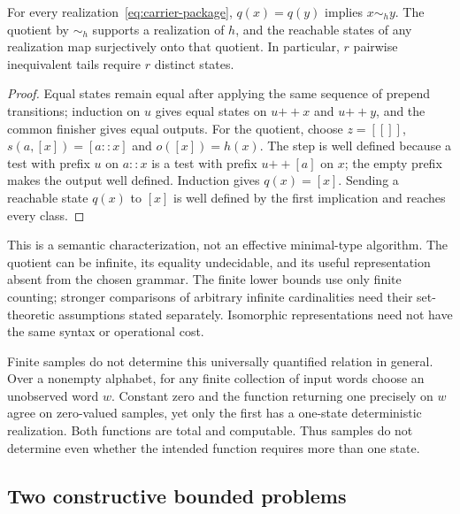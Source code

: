 \begin{theorem}
\label{thm:carrier-quotient}
For every realization~\eqref{eq:carrier-package}, $q(x)=q(y)$ implies
$x\sim_h y$. The quotient by $\sim_h$ supports a realization of $h$, and
the reachable states of any realization map surjectively onto that quotient.
In particular, $r$ pairwise inequivalent tails require $r$ distinct states.
\end{theorem}
\begin{proof}
Equal states remain equal after applying the same sequence of prepend
transitions; induction on $u$ gives equal states on $u\mathbin{+\!+}x$ and
$u\mathbin{+\!+}y$, and the common finisher gives equal outputs. For the
quotient, choose $z=[[]]$, $s(a,[x])=[a::x]$ and $o([x])=h(x)$.
The step is well defined because a test with prefix $u$ on $a::x$ is a test
with prefix $u\mathbin{+\!+}[a]$ on $x$; the empty prefix makes the output
well defined. Induction gives $q(x)=[x]$. Sending a reachable state $q(x)$
to $[x]$ is well defined by the first implication and reaches every class.
\end{proof}

This is a semantic characterization, not an effective minimal-type algorithm.
The quotient can be infinite, its equality undecidable, and its useful
representation absent from the chosen grammar. The finite lower bounds use
only finite counting; stronger comparisons of arbitrary infinite cardinalities
need their set-theoretic assumptions stated separately. Isomorphic
representations need not have the same syntax or operational cost.

Finite samples do not determine this universally quantified relation in
general. Over a nonempty alphabet, for any finite collection of input words
choose an unobserved word $w$. Constant zero
and the function returning one precisely on $w$ agree on zero-valued samples,
yet only the first has a one-state deterministic realization. Both functions
are total and computable. Thus samples do not determine even whether the
intended function requires more than one state.

\subsection{Two constructive bounded problems}
\label{sec:carrier-finite}

